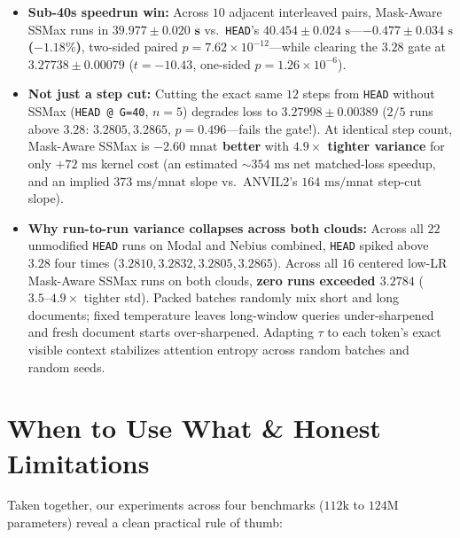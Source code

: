 \documentclass[10pt]{article}
\begin{document}
\begin{itemize}
  \item \textbf{Sub-40s speedrun win:} Across $10$ adjacent interleaved pairs, Mask-Aware SSMax runs in $\mathbf{39.977 \pm 0.020\text{ s}}$ vs.\ \texttt{HEAD}'s $40.454 \pm 0.024\text{ s}$---\textbf{$-0.477 \pm 0.034\text{ s}$ ($-1.18\%$)}, two-sided paired $p = 7.62\times 10^{-12}$---while clearing the $3.28$ gate at $3.27738 \pm 0.00079$ ($t = -10.43$, one-sided $p = 1.26\times 10^{-6}$).
  \item \textbf{Not just a step cut:} Cutting the exact same $12$ steps from \texttt{HEAD} without SSMax (\texttt{HEAD @ G=40}, $n=5$) degrades loss to $3.27998 \pm 0.00389$ ($2/5$ runs above $3.28$: $3.2805, 3.2865$, $p=0.496$---fails the gate!). At identical step count, Mask-Aware SSMax is \textbf{$-2.60\text{ mnat}$ better} with \textbf{$4.9\times$ tighter variance} for only $+72\text{ ms}$ kernel cost (an estimated $\sim 354\text{ ms}$ net matched-loss speedup, and an implied $373\text{ ms/mnat}$ slope vs.\ ANVIL2's $164\text{ ms/mnat}$ step-cut slope).
  \item \textbf{Why run-to-run variance collapses across both clouds:} Across all $22$ unmodified \texttt{HEAD} runs on Modal and Nebius combined, \texttt{HEAD} spiked above $3.28$ four times ($3.2810, 3.2832, 3.2805, 3.2865$). Across all $16$ centered low-LR Mask-Aware SSMax runs on both clouds, \textbf{zero runs exceeded $3.2784$} ($3.5\text{--}4.9\times$ tighter std). Packed batches randomly mix short and long documents; fixed temperature leaves long-window queries under-sharpened and fresh document starts over-sharpened. Adapting $\tau$ to each token's exact visible context stabilizes attention entropy across random batches and random seeds.
\end{itemize}

\section{When to Use What \& Honest Limitations}
\label{sec:disc}

Taken together, our experiments across four benchmarks ($112\text{k}$ to $124\text{M}$ parameters) reveal a clean practical rule of thumb:
\end{document}
